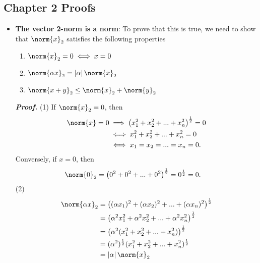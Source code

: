 \documentclass{report}
\begin{document}
    \pagebreak 
    \subsection{Chapter 2 Proofs}
    \begin{itemize}
        \item \textbf{The vector 2-norm is a norm}: To prove that this is true, we need to show that $\norm{x}_{2}$ satisfies the following properties
            \begin{enumerate}
                \item $\norm{x}_{2} = 0 \iff x = 0$
                \item $\norm{\alpha x}_{2} = \left\lvert \alpha \right\rvert \norm{x}_{2} $
                \item $\norm{x + y}_{2} \leq \norm{x}_{2}  + \norm{y}_{2} $
            \end{enumerate}
            \bigbreak \noindent 
            \textbf{\textit{Proof.}} (1) If $\norm{x}_{2} = 0$, then
            \begin{align*}
                \norm{x} = 0 &\implies \left(x_{1}^{2} + x_{2}^{2} + ... + x_{n}^{2}\right)^{\frac{1}{2}} = 0 \\
                             &\iff x_{1}^{2} + x_{2}^{2} + ... + x_{n}^{2} = 0 \\
                             &\iff x_{1} = x_{2} =  ... = x_{n} = 0
            .\end{align*}
            Conversely, if $x=0$, then
            \begin{align*}
                \norm{0}_{2} &= \left(0^{2} + 0^{2} + ... + 0^{2}\right)^{\frac{1}{2}} = 0^{\frac{1}{2}} = 0
            .\end{align*}
            (2)
            \begin{align*}
                \norm{\alpha x}_{2} &= \left((\alpha x_{1})^{2} + (\alpha x_{2})^{2} + ... + (\alpha x_{n})^{2}\right)^{\frac{1}{2}} \\
                                &= \left(\alpha^{2} x_{1}^{2} + \alpha^{2} x_{2}^{2} + ... + \alpha^{2} x_{n}^{2}\right)^{\frac{1}{2}} \\
                                &= \left(\alpha^{2}(x_{1}^{2} + x_{2}^{2} + ... + x_{n}^{2})\right)^{\frac{1}{2}} \\
                                &= (\alpha^{2})^{\frac{1}{2}}  (x_{1}^{2} + x_{2}^{2} + ... + x_{n}^{2})^{\frac{1}{2}} \\
                                &= \left\lvert \alpha \right\rvert \norm{x}_{2}

\end{align*}
\end{itemize}
\end{document}
